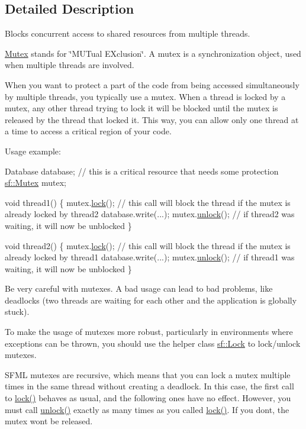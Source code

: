 \subsection{Detailed Description}
Blocks concurrent access to shared resources from multiple threads. 

\hyperlink{classsf_1_1_mutex}{Mutex} stands for \char`\"{}\+M\+U\+Tual E\+Xclusion\char`\"{}. A mutex is a synchronization object, used when multiple threads are involved.

When you want to protect a part of the code from being accessed simultaneously by multiple threads, you typically use a mutex. When a thread is locked by a mutex, any other thread trying to lock it will be blocked until the mutex is released by the thread that locked it. This way, you can allow only one thread at a time to access a critical region of your code.

Usage example\+: 
\begin{DoxyCode}
Database database; \textcolor{comment}{// this is a critical resource that needs some protection}
\hyperlink{classsf_1_1_mutex}{sf::Mutex} mutex;

\textcolor{keywordtype}{void} thread1()
\{
    mutex.\hyperlink{classsf_1_1_mutex_a1a16956a6bbea764480c1b80f2e45763}{lock}(); \textcolor{comment}{// this call will block the thread if the mutex is already locked by thread2}
    database.write(...);
    mutex.\hyperlink{classsf_1_1_mutex_ade71268ffc5e80756652058b01c23c33}{unlock}(); \textcolor{comment}{// if thread2 was waiting, it will now be unblocked}
\}

\textcolor{keywordtype}{void} thread2()
\{
    mutex.\hyperlink{classsf_1_1_mutex_a1a16956a6bbea764480c1b80f2e45763}{lock}(); \textcolor{comment}{// this call will block the thread if the mutex is already locked by thread1}
    database.write(...);
    mutex.\hyperlink{classsf_1_1_mutex_ade71268ffc5e80756652058b01c23c33}{unlock}(); \textcolor{comment}{// if thread1 was waiting, it will now be unblocked}
\}
\end{DoxyCode}


Be very careful with mutexes. A bad usage can lead to bad problems, like deadlocks (two threads are waiting for each other and the application is globally stuck).

To make the usage of mutexes more robust, particularly in environments where exceptions can be thrown, you should use the helper class \hyperlink{classsf_1_1_lock}{sf\+::\+Lock} to lock/unlock mutexes.

S\+F\+ML mutexes are recursive, which means that you can lock a mutex multiple times in the same thread without creating a deadlock. In this case, the first call to \hyperlink{classsf_1_1_mutex_a1a16956a6bbea764480c1b80f2e45763}{lock()} behaves as usual, and the following ones have no effect. However, you must call \hyperlink{classsf_1_1_mutex_ade71268ffc5e80756652058b01c23c33}{unlock()} exactly as many times as you called \hyperlink{classsf_1_1_mutex_a1a16956a6bbea764480c1b80f2e45763}{lock()}. If you don\textquotesingle{}t, the mutex won\textquotesingle{}t be released.

